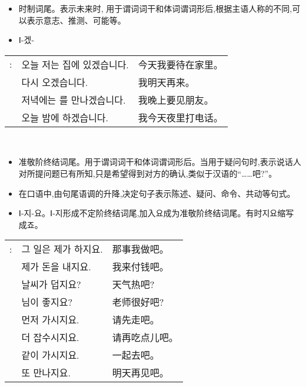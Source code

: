 \begin{grammar}
	\begin{grammarsect}[-겠-]
		\begin{itemize}
			\item 时制词尾。表示未来时, 用于谓词词干和体词谓词形后,根据主语人称的不同,可以表示意志、推测、可能等。
			\item {\kr \color{gray} Ⅰ-겠-}
		\end{itemize}
		\begin{tabular}{lll}
			\kr \ruby{例}{예}: & \kr 오늘 저는 집에 있겠습니다.             & 今天我要待在家里。 \\
			             & \kr \ruby{來日}{내일} 다시 오겠습니다.     & 我明天再来。    \\
			             & \kr 저녁에는 \ruby{親舊}{친구}를 만나겠습니다. & 我晚上要见朋友。  \\
			             & \kr 오늘 밤에 \ruby{電話}{전화}하겠습니다.   & 我今天夜里打电话。
		\end{tabular}\\
	\end{grammarsect}
	\begin{grammarsect}[-지요]
		\begin{itemize}
			\item 准敬阶终结词尾。用于谓词词干和体词谓词形后。当用于疑问句时,表示说话人对所提问题已有所知,只是希望得到对方的确认,类似于汉语的“……吧?”。
			\item 在口语中,由句尾语调的升降,决定句子表示陈述、疑问、命令、共动等句式。
			\item {\color{gray} Ⅰ-지-요。Ⅰ-지形成不定阶终结词尾,加入요成为准敬阶终结词尾。有时지요缩写成죠。}
		\end{itemize}
		\begin{tabular}{lll}
			\kr \ruby{例}{예}: &\kr  그 일은 제가 하지요.          & 那事我做吧。  \\
			             &\kr  제가 돈을 내지요.            & 我来付钱吧。  \\
			             & \kr 날씨가 덥지요?              & 天气热吧?   \\
			             & \kr \ruby{先生}{선생}님이 좋지요?  & 老师很好吧?  \\
			             & \kr 먼저 가시지요.              & 请先走吧。   \\
			             & \kr 더 잡수시지요.              & 请再吃点儿吧。 \\
			             & \kr 같이 가시지요.              & 一起去吧。   \\
			             & \kr \ruby{來日}{내일} 또 만나지요. & 明天再见吧。  \\
		\end{tabular}\\
	\end{grammarsect}
\end{grammar}
